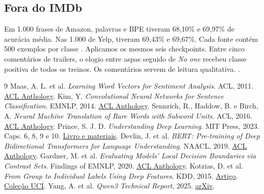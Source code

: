 \subsection{Fora do IMDb}
Em 1.000 frases de Amazon, palavras e BPE tiveram 68,10\% e 69,97\% de
acurácia média. Nas 1.000 de Yelp, tiveram 69,43\% e 69,67\%.
Cada fonte contém 500 exemplos por classe \cite{kotzias}. Aplicamos
os mesmos seis checkpoints. Entre cinco comentários de trailers,
o elogio entre aspas seguido de \textit{No one} recebeu classe positiva
de todos os treinos. Os comentários servem de leitura qualitativa.
.

\begin{thebibliography}{9}
\footnotesize
\setlength{\itemsep}{0pt}
\setlength{\parskip}{0pt}
 Maas, A. L. et al. \textit{Learning Word Vectors for Sentiment Analysis}.
ACL, 2011. \href{https://aclanthology.org/P11-1015/}{ACL Anthology}.
 Kim, Y. \textit{Convolutional Neural Networks for Sentence Classification}.
EMNLP, 2014. \href{https://aclanthology.org/D14-1181/}{ACL Anthology}.
 Sennrich, R., Haddow, B. e Birch, A.
\textit{Neural Machine Translation of Rare Words with Subword Units}. ACL, 2016.
\href{https://aclanthology.org/P16-1162/}{ACL Anthology}.
 Prince, S. J. D. \textit{Understanding Deep Learning}.
MIT Press, 2023. Caps. 6, 8, 9 e 10. \href{https://udlbook.github.io/udlbook/}{Livro e materiais}.
 Devlin, J. et al. \textit{BERT: Pre-training of Deep Bidirectional
Transformers for Language Understanding}. NAACL, 2019. \href{https://aclanthology.org/N19-1423/}{ACL Anthology}.
 Gardner, M. et al. \textit{Evaluating Models' Local Decision
Boundaries via Contrast Sets}. Findings of EMNLP, 2020.
\href{https://aclanthology.org/2020.findings-emnlp.117/}{ACL Anthology}.
 Kotzias, D. et al. \textit{From Group to Individual Labels Using Deep Features}.
KDD, 2015. \href{https://doi.org/10.1145/2783258.2783380}{Artigo}.
\href{https://doi.org/10.24432/C57604}{Coleção UCI}.
 Yang, A. et al. \textit{Qwen3 Technical Report}, 2025.
\href{https://arxiv.org/abs/2505.09388}{arXiv}.
\end{thebibliography}
